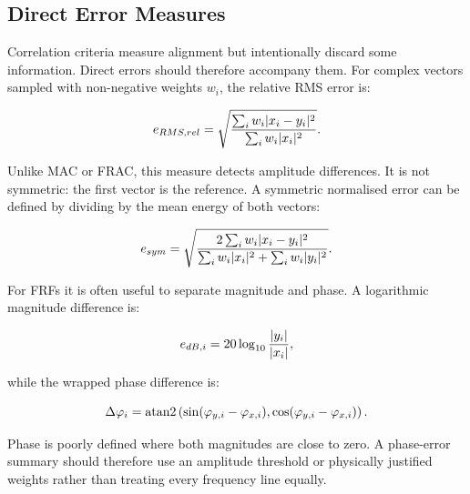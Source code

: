 \subsection{Direct Error Measures}

Correlation criteria measure alignment but intentionally discard some
information. Direct errors should therefore accompany them. For complex vectors
sampled with non-negative weights $w_i$, the relative RMS error is:

\begin{equation}\label{relative-rms-complex}
    e_{RMS,rel}=
    \sqrt{
        \frac{\sum_i w_i| {x_i-y_i} |^{2}}
             {\sum_i w_i| {x_i} |^{2}}
    }.
\end{equation}

Unlike MAC or FRAC, this measure detects amplitude differences. It is not
symmetric: the first vector is the reference. A symmetric normalised error can
be defined by dividing by the mean energy of both vectors:

\begin{equation}\label{symmetric-normalised-error}
    e_{sym}=
    \sqrt{
        \frac{2\sum_i w_i| {x_i-y_i} |^{2}}
             {\sum_i w_i| {x_i} |^{2}+\sum_i w_i| {y_i} |^{2}}
    }.
\end{equation}

For FRFs it is often useful to separate magnitude and phase. A logarithmic
magnitude difference is:

\begin{equation}
    e_{dB,i}=20\log_{10}\frac{| {y_i} |}{| {x_i} |},
\end{equation}

while the wrapped phase difference is:

\begin{equation}
    \Delta\varphi_i=
    \operatorname{atan2}\left(
        \sin(\varphi_{y,i}-\varphi_{x,i}),
        \cos(\varphi_{y,i}-\varphi_{x,i})
    \right).
\end{equation}

Phase is poorly defined where both magnitudes are close to zero. A phase-error
summary should therefore use an amplitude threshold or physically justified
weights rather than treating every frequency line equally.

